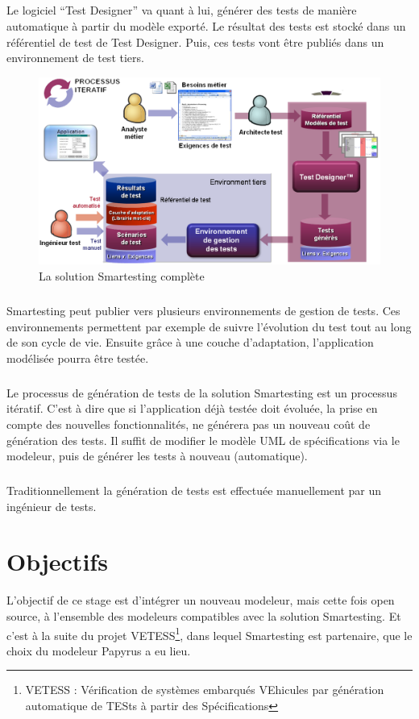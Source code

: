 \subparagraph*{}
Le logiciel ``Test Designer'' va quant à lui, générer des tests de manière automatique à partir du modèle exporté.
Le résultat des tests est stocké dans un référentiel de test de Test Designer.
Puis, ces tests vont être publiés dans un environnement de test tiers.

\begin{figure}[!ht]
\begin{center}
  \includegraphics[width=\textwidth]{images/TheSolutionSmartesting.png}
  \caption{La solution Smartesting complète}
  \label{figure:TheSolutionSmartesting}
\end{center}
\end{figure}

\subparagraph*{}
Smartesting peut publier vers plusieurs environnements de gestion de tests. Ces environnements permettent par exemple de suivre l'évolution du test tout au long de son cycle de vie. Ensuite grâce à une couche d'adaptation, l'application modélisée pourra être testée.

\subparagraph*{}
Le processus de génération de tests de la solution Smartesting est un processus itératif. C'est à dire que si l'application déjà testée doit évoluée, la prise en compte des nouvelles fonctionnalités, ne générera pas un nouveau coût de génération des tests. 
Il suffit de modifier le modèle UML de spécifications via le modeleur, puis de générer les tests à nouveau (automatique).

\subparagraph*{}
Traditionnellement la génération de tests est effectuée manuellement par un ingénieur de tests.

\section{Objectifs}

L’objectif de ce stage est d'intégrer un nouveau modeleur, mais cette fois open source, à l'ensemble des modeleurs compatibles avec la solution Smartesting.
Et c'est à la suite du projet VETESS\footnote{VETESS : Vérification de systèmes embarqués VEhicules par génération automatique de TESts à partir des Spécifications}, dans lequel Smartesting est partenaire, que le choix du modeleur Papyrus a eu lieu.

